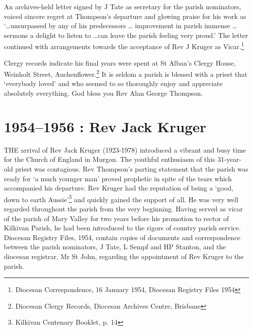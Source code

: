 An archives-held letter signed by J Tate as secretary for the parish nominators, voiced sincere regret at Thompson's departure and glowing praise for his work as `\ldots unsurpassed by any of his predecessors \ldots{} improvement in parish immense \ldots{} sermons a delight to listen to \ldots can leave the parish feeling very proud.' The letter continued with arrangements towards the acceptance of Rev J Kruger as Vicar.\footnote{Diocesan Correspondence, 16 January 1954, Diocesan Registry Files 1954}


Clergy records indicate his final years were spent at St Alban's Clergy House, Weinholt Street, Auchenflower.\footnote{Diocesan Clergy Records, Diocesan Archives Centre, Brisbane} It is seldom a parish is blessed with a priest that `everybody loved' and who seemed to so thoroughly enjoy and appreciate absolutely everything. God bless you Rev Alan George Thompson.


\balance


\printendnotes[custom]
\setcounter{endnote}{0}
\chapter{1954--1956 : Rev Jack Kruger}
\nobalance


\lettrine[lines=3]{T}{HE}
 arrival of Rev Jack Kruger (1923-1978) introduced a vibrant and busy time for the Church of England in Murgon. The youthful enthusiasm of this 31-year-old priest was contagious. Rev Thompson's parting statement that the parish was ready for `a much younger man' proved prophetic in spite of the tears which accompanied his departure. Rev Kruger had the reputation of being a `good, down to earth Aussie'\footnote{Kilkivan Centenary Booklet, p. 14} and quickly gained the support of all. He was very well regarded throughout the parish from the very beginning. Having served as vicar of the parish of Mary Valley for two years before his promotion to rector of Kilkivan Parish, he had been introduced to the rigors of country parish service. Diocesan Registry Files, 1954, contain copies of documents and correspondence between the parish nominators, J Tate, L Sempf and HP Stanton, and the diocesan registrar, Mr St John, regarding the appointment of Rev Kruger to the parish.

